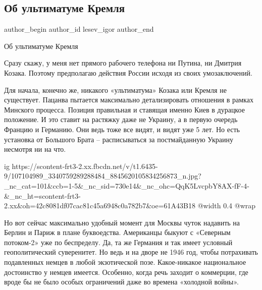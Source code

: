  
 
 
 
 
 
\subsection{Об ультиматуме Кремля}
\label{sec:06_07_2020.fb.lesev_igor.1.kreml_ultimatum}
 
\ifcmt
 author_begin
   author_id lesev_igor
 author_end
\fi

Об ультиматуме Кремля

Сразу скажу, у меня нет прямого рабочего телефона ни Путина, ни Дмитрия Козака.
Поэтому предполагаю действия России исходя из своих умозаключений.

Для начала, конечно же, никакого «ультиматума» Козака или Кремля не существует.
Пацанва пытается максимально детализировать отношения в рамках Минского
процесса. Позиция правильная и ставящая именно Киев в дурацкое положение. И это
ставит на растяжку даже не Украину, а в первую очередь Францию и Германию. Они
ведь тоже все видят, и видят уже 5 лет. Но есть установка от Большого Брата –
расписываться за постмайданную Украину несмотря ни на что.

\ifcmt
  ig https://scontent-frt3-2.xx.fbcdn.net/v/t1.6435-9/107104989_3340759289288484_8845620105834256873_n.jpg?_nc_cat=101&ccb=1-5&_nc_sid=730e14&_nc_ohc=QqK5LvcpbY8AX-fF-4-&_nc_ht=scontent-frt3-2.xx&oh=42c8081df07cac81c45a6948c0a782b7&oe=61A43B18
  @width 0.4
	@wrap 
\fi

Но вот сейчас максимально удобный момент для Москвы чуток надавить на Берлин и
Париж в плане буквоедства. Американцы быкуют с «Северным потоком-2» уже по
беспределу. Да, та же Германия и так имеет условный геополитический
суверенитет. Но ведь и на дворе не 1946 год, чтобы потрахивать подавленных
немцев в любой экзотической позе. Какое-никакое национальное достоинство у
немцев имеется. Особенно, когда речь заходит о коммерции, где вроде бы не было
особых ограничений даже во времена «холодной войны».

